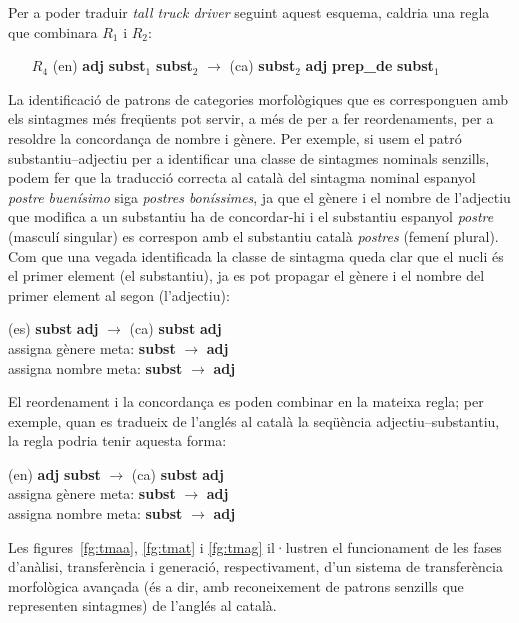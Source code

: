 Per a poder traduir \emph{tall truck driver} seguint aquest esquema,
caldria una regla que combinara \(R_1\) i \(R_2\):
\begin{itemize}
\item[$R_4$] (en) \textbf{adj} \textbf{subst}$_1$ \textbf{subst}$_2$ 
$\rightarrow$ (ca) \textbf{subst}$_2$ \textbf{adj} \textbf{prep\_de} \textbf{subst}$_1$ 
\end{itemize}  


La identificació de patrons de categories morfològiques que es
corresponguen amb els sintagmes més freqüents pot servir, a més de per
a fer reordenaments, per a resoldre la concordança de nombre i
gènere. Per exemple, si usem el patró substantiu--adjectiu per a
identificar una classe de sintagmes nominals senzills, podem fer que
la traducció correcta al català del sintagma nominal espanyol {\em
  postre buenísimo} siga \emph{postres boníssimes}, ja que el gènere i
el nombre de l'adjectiu que modifica a un substantiu ha de
concordar-hi i el substantiu espanyol \emph{postre} (masculí singular)
es correspon amb el substantiu català \emph{postres} (femení plural).
Com que una vegada identificada la classe de sintagma queda clar que
el nucli és el primer element (el substantiu), ja es pot propagar el
gènere i el nombre del primer element al segon (l'adjectiu):
\begin{center}
  (es) \textbf{subst} \textbf{adj}  \(\to\) (ca) \textbf{subst} \textbf{adj} \\
  assigna gènere meta: \textbf{subst} \(\to\) \textbf{adj}\\
  assigna nombre meta: \textbf{subst} \(\to\) \textbf{adj}
\end{center}

El reordenament i la concordança es poden combinar en la mateixa
regla; per exemple, quan es tradueix de l'anglés al català la
seqüència adjectiu--substantiu, la regla podria tenir aquesta
forma: 
\begin{center}
  (en) \textbf{adj} \textbf{subst} \(\to\) (ca) \textbf{subst} \textbf{adj} \\
  assigna gènere meta: \textbf{subst} \(\to\) \textbf{adj}\\
  assigna nombre meta: \textbf{subst} \(\to\) \textbf{adj}
\end{center}

Les figures~\ref{fg:tmaa}, \ref{fg:tmat} i \ref{fg:tmag} il·lustren el
funcionament de les fases d'anàlisi, transferència i generació,
respectivament, d'un sistema de transferència morfològica avançada (és
a dir, amb reconeixement de patrons senzills que representen
sintagmes) de l'anglés al català.

